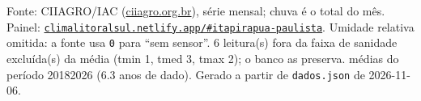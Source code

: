 \documentclass[10pt,a4paper]{article}
\begin{document}
\vspace{1pt}
{\tiny\color{cinza}
Fonte: CIIAGRO/IAC (\href{http://ciiagro.org.br}{ciiagro.org.br}), série mensal;
chuva é o total do mês. Painel:
\href{https://climalitoralsul.netlify.app/\#itapirapua-paulista}%
{\texttt{climalitoralsul.netlify.app/\#itapirapua-paulista}}.
Umidade relativa omitida: a fonte usa \texttt{0} para ``sem sensor''.  6 leitura(s) fora da faixa de sanidade excluída(s) da média (tmin 1, tmed 3, tmax 2); o banco as preserva.
médias do período 2018\textendash{}2026 (6.3 anos de dado).
Gerado a partir de \texttt{dados.json} de 2026-11-06.}
\end{document}
